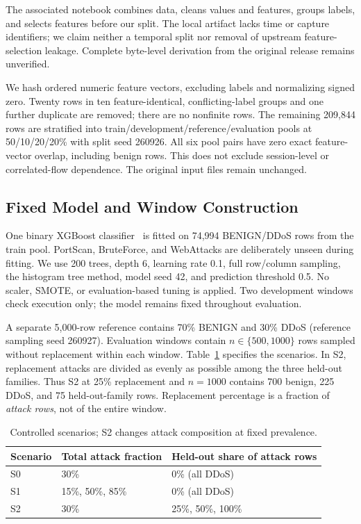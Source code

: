 \documentclass[runningheads]{llncs}
\begin{document}
The associated notebook combines data, cleans values and features, groups labels, and selects features before our split. The local artifact lacks time or capture identifiers; we claim neither a temporal split nor removal of upstream feature-selection leakage. Complete byte-level derivation from the original release remains unverified.

We hash ordered numeric feature vectors, excluding labels and normalizing signed zero. Twenty rows in ten feature-identical, conflicting-label groups and one further duplicate are removed; there are no nonfinite rows. The remaining 209,844 rows are stratified into train/development/reference/evaluation pools at 50/10/20/20\% with split seed 260926. All six pool pairs have zero exact feature-vector overlap, including benign rows. This does not exclude session-level or correlated-flow dependence. The original input files remain unchanged.

\subsection{Fixed Model and Window Construction}
One binary XGBoost classifier~\cite{xgboost} is fitted on 74,994 BENIGN/DDoS rows from the train pool. PortScan, BruteForce, and WebAttacks are deliberately unseen during fitting. We use 200 trees, depth 6, learning rate 0.1, full row/column sampling, the histogram tree method, model seed 42, and prediction threshold 0.5. No scaler, SMOTE, or evaluation-based tuning is applied. Two development windows check execution only; the model remains fixed throughout evaluation.

A separate 5,000-row reference contains 70\% BENIGN and 30\% DDoS (reference sampling seed 260927). Evaluation windows contain $n\in\{500,1000\}$ rows sampled without replacement within each window. Table~\ref{tab:scenarios} specifies the scenarios. In S2, replacement attacks are divided as evenly as possible among the three held-out families. Thus S2 at 25\% replacement and $n=1000$ contains 700 benign, 225 DDoS, and 75 held-out-family rows. Replacement percentage is a fraction of \emph{attack rows}, not of the entire window.

\begin{table}[t]
\caption{Controlled scenarios; S2 changes attack composition at fixed prevalence.}
\label{tab:scenarios}
\centering
\begin{tabular}{@{}lll@{}}
\toprule
Scenario & Total attack fraction & Held-out share of attack rows \\
\midrule
S0 & 30\% & 0\% (all DDoS) \\
S1 & 15\%, 50\%, 85\% & 0\% (all DDoS) \\
S2 & 30\% & 25\%, 50\%, 100\% \\
\bottomrule
\end{tabular}
\end{table}
\end{document}
